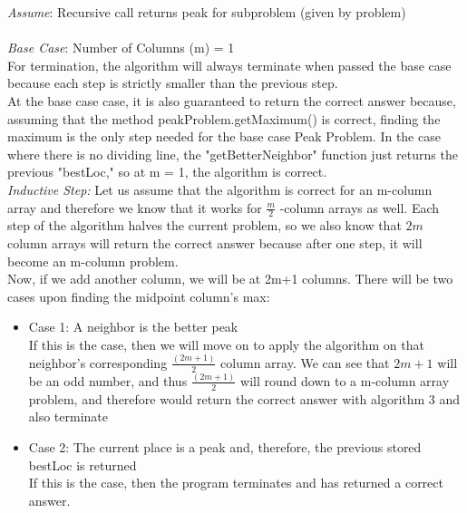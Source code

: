 \documentclass[12pt,twoside]{article}
\begin{document}
\begin{problems}
\begin{problemparts}
\problempart 
\textit{ Assume}: Recursive call returns peak for subproblem (given by problem)\\\\
\textit{Base Case}: Number of Columns (m) = 1\\
For termination, the algorithm will always terminate when passed the base case because each step is strictly smaller than the previous step.\\
At the base case case, it is also guaranteed to return the correct answer because, assuming that the method peakProblem.getMaximum() is correct, finding the maximum is the only step needed for the base case Peak Problem. In the case where there is no dividing line, the "getBetterNeighbor" function just returns the previous "bestLoc," so at m = 1, the algorithm is correct. \\
\textit{Inductive Step:} Let us assume that the algorithm is correct for an m-column array and therefore we know that it works for $\frac{m}{2}$ -column arrays as well. Each step of the algorithm halves the current problem, so we also know that $2m$ column arrays will return the correct answer because after one step, it will become an m-column problem. \\ Now, if we add another column, we will be at 2m+1 columns. There will be two cases upon finding the midpoint column's max:
\begin{itemize}
\item Case 1: A neighbor is the better peak\\
If this is the case, then we will move on to apply the algorithm on that neighbor's corresponding $\frac{(2m+1)}{2}$ column array. We can see that $2m+1$ will be an odd number, and thus   $\frac{(2m+1)}{2}$ will round down to a m-column array problem, and therefore would return the correct answer with algorithm 3 and also terminate\\
\item Case 2: The current place is a peak and, therefore, the previous stored bestLoc is returned\\
If this is the case, then the program terminates and has returned a correct answer.
\end{itemize}

\end{problemparts}


\end{problems}
\end{document}
